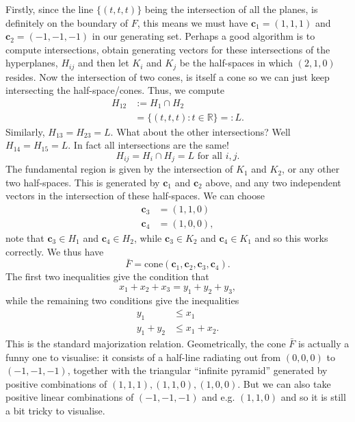\documentclass[pra,
aps,
twocolumn,
superscriptaddress,
groupedaddress,
nofootinbib,
reprint
]{revtex4-1}
\begin{document}
Firstly, since the line $\{(t,t,t)\}$ being the intersection of all the planes, is definitely on the boundary of $F$, this means we must have $\mathbf{c}_1 = (1,1,1)$ and $\mathbf{c}_2 = (-1,-1,-1)$ in our generating set. Perhaps a good algorithm is to compute intersections, obtain generating vectors for these intersections of the hyperplanes, $H_{ij}$ and then let $K_i$ and $K_j$ be the half-spaces in which $(2,1,0)$ resides. Now the intersection of two cones, is itself a cone so we can just keep intersecting the half-space/cones. Thus, we compute
\begin{align}
H_{12} &:= H_1 \cap H_2 \\
&=\{ (t,t,t) : t\in \mathbb{R}\}=:L.
\end{align}
Similarly, $H_{13} = H_{23}= L$. What about the other intersections? Well $H_{14} = H_{15}=L$. In fact all intersections are the same! 
\begin{equation}
H_{ij} = H_i \cap H_j = L \mbox{ for all } i,j.
\end{equation}
The fundamental region is given by the intersection of $K_1$ and $K_2$, or any other two half-spaces. This is generated by $\mathbf{c}_1$ and $\mathbf{c}_2$ above, and any two independent vectors in the intersection of these half-spaces. We can choose 
\begin{align}
\mathbf{c}_3 &= (1,1,0) \\
\mathbf{c}_4 &= (1,0,0),
\end{align}
note that $\mathbf{c}_3 \in H_1$ and $\mathbf{c}_4 \in H_2$, while $\mathbf{c}_3 \in K_2$ and $\mathbf{c}_4 \in K_1$ and so this works correctly. We thus have
\begin{equation}
\bar{F} = \mbox{cone}(\mathbf{c}_1 ,\mathbf{c}_2 ,\mathbf{c}_3 ,\mathbf{c}_4 ).
\end{equation}
The first two inequalities give the condition that
\begin{equation}
x_1+x_2+x_3 = y_1+y_2+y_3,
\end{equation}
while the remaining two conditions give the inequalities
\begin{align}
y_1 &\le x_1 \\
y_1+y_2 &\le x_1 +x_2.
\end{align}
This is the standard majorization relation. Geometrically, the cone $\bar{F}$ is actually a funny one to visualise: it consists of a half-line radiating out from $(0,0,0)$ to $(-1, -1, -1)$, together with the triangular ``infinite pyramid'' generated by positive combinations of $(1,1,1), (1,1,0), (1,0,0)$. But we can also take positive linear combinations of $(-1,-1,-1)$ and e.g. $(1,1,0)$ and so it is still a bit tricky to visualise.
\end{document}
